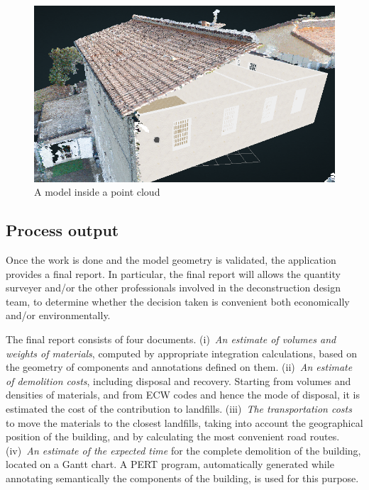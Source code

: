 \begin{figure}[htbp] %
   \centering
   \includegraphics[width=1\linewidth]{images/augmented}
   \caption{A model inside a point cloud}
   \label{fig:augmented}
\end{figure}

\vspace{-3mm}\subsection{Process output}\vspace{-3mm}

\noindent 
Once the work is done and the model geometry is validated, the application provides a final report.
In particular, the final report will allows the quantity surveyer and/or the other professionals involved in the deconstruction design team, to determine whether the decision taken is convenient both economically and/or environmentally.

The final report consists of four documents.
(i)~\emph{An estimate of volumes and weights of materials}, computed by appropriate integration calculations, based on the geometry of components and annotations defined on them.
(ii)~\emph{An estimate of demolition costs}, including disposal and recovery.
Starting from volumes and densities of materials, and from ECW codes and hence the mode of disposal, it is estimated the cost of the contribution to landfills.
(iii)~\emph{The transportation costs} to move the materials to the closest landfills, taking into account the geographical position of the building, and by calculating the most convenient road routes.
(iv)~\emph{An estimate of the expected time} for the complete demolition of the building, located on a Gantt chart. A PERT program, automatically generated while annotating semantically the components of the building, is used for this purpose.

\noindent